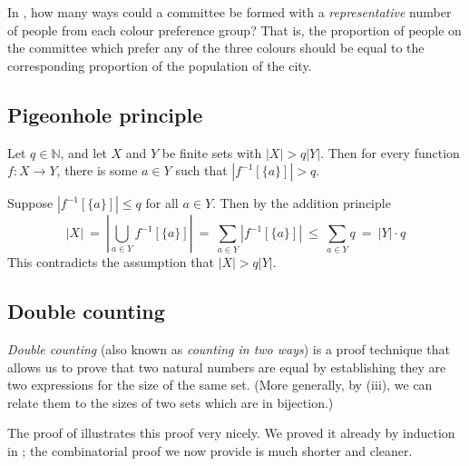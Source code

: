 \begin{exercise}
\label{exCityColourModified}
In , how many ways could a committee be formed with a \textit{representative} number of people from each colour preference group? That is, the proportion of people on the committee which prefer any of the three colours should be equal to the corresponding proportion of the population of the city.
\end{exercise}

\subsection*{Pigeonhole principle}

\todo{}

\begin{theorem}
\label{thmPigeonholePrinciple}
Let $q \in \mathbb{N}$, and let $X$ and $Y$ be finite sets with $|X| > q|Y|$. Then for every function $f : X \to Y$, there is some $a \in Y$ such that $|f^{-1}[\{a\}]| > q$.
\end{theorem}

\begin{cproof}
Suppose $|f^{-1}[\{a\}]| \le q$ for all $a \in Y$. Then by the addition principle
\[ |X| ~=~ \left| \bigcup_{a \in Y} f^{-1}[\{a\}] \right| ~=~ \sum_{a \in Y} |f^{-1}[\{a\}]| ~\le~ \sum_{a \in Y} q ~=~ |Y| \cdot q \]
This contradicts the assumption that $|X| > q|Y|$.
\end{cproof}

\todo{}

\subsection*{Double counting}

\textit{Double counting} (also known as \textit{counting in two ways})
is a proof technique that allows us to prove that two natural numbers are equal by establishing they are two expressions for the size of the same set. (More generally, by (iii), we can relate them to the sizes of two sets which are in bijection.)

The proof of  illustrates this proof very nicely. We proved it already by induction in ; the combinatorial proof we now provide is much shorter and cleaner.

